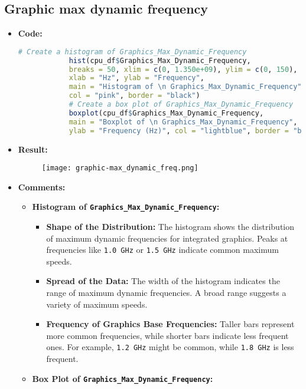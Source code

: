 \documentclass{article}
\begin{document}
	\subsection{Graphic max dynamic frequency}
	\begin{itemize}
		\item \textbf{Code:}
		\begin{lstlisting}[basicstyle=\ttfamily, frame=single,language=R]
			# Create a histogram of Graphics_Max_Dynamic_Frequency
			hist(cpu_df$Graphics_Max_Dynamic_Frequency, 
			breaks = 50, xlim = c(0, 1.350e+09), ylim = c(0, 150), 
			xlab = "Hz", ylab = "Frequency", 
			main = "Histogram of \n Graphics_Max_Dynamic_Frequency", 
			col = "pink", border = "black")
			# Create a box plot of Graphics_Max_Dynamic_Frequency
			boxplot(cpu_df$Graphics_Max_Dynamic_Frequency, 
			main = "Boxplot of \n Graphics_Max_Dynamic_Frequency", 
			ylab = "Frequency (Hz)", col = "lightblue", border = "black")
		\end{lstlisting}
		\item \textbf{Result:}
		\begin{figure}[h]
			\centering
			\texttt{[image: graphic-max\_dynamic\_freq.png]}  %
			\label{fig:enter-label}
		\end{figure}
		\item \textbf{Comments:}
		\begin{itemize}
			\item \textbf{Histogram of \texttt{Graphics\_Max\_Dynamic\_Frequency}:}
			\begin{itemize}
				\item \textbf{Shape of the Distribution:} The histogram shows the distribution of maximum dynamic frequencies for integrated graphics. Peaks at frequencies like \texttt{1.0 GHz} or \texttt{1.5 GHz} indicate common maximum speeds.
				\item \textbf{Spread of the Data:} The width of the histogram indicates the range of maximum dynamic frequencies. A broad range suggests a variety of maximum speeds.
				\item \textbf{Frequency of Graphics Base Frequencies:} Taller bars represent more common frequencies, while shorter bars indicate less frequent ones. For example, \texttt{1.2 GHz} might be common, while \texttt{1.8 GHz} is less frequent.
			\end{itemize}
			\item \textbf{Box Plot of \texttt{Graphics\_Max\_Dynamic\_Frequency}:}
			\begin{itemize}

\end{itemize}
\end{itemize}
\end{itemize}
\end{document}
